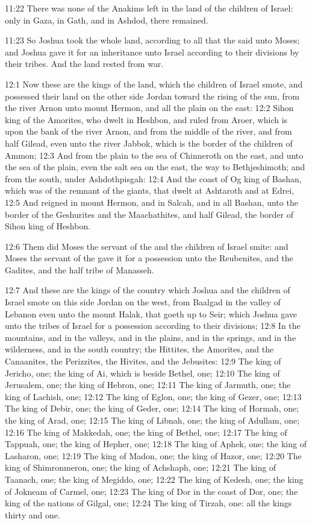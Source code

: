 11:22 There was none of the Anakims left in the land of the children
of Israel: only in Gaza, in Gath, and in Ashdod, there remained.

11:23 So Joshua took the whole land, according to all that the \LORD
said unto Moses; and Joshua gave it for an inheritance unto Israel
according to their divisions by their tribes. And the land rested from
war.

12:1 Now these are the kings of the land, which the children of Israel
smote, and possessed their land on the other side Jordan toward the
rising of the sun, from the river Arnon unto mount Hermon, and all the
plain on the east: 12:2 Sihon king of the Amorites, who dwelt in
Heshbon, and ruled from Aroer, which is upon the bank of the river
Arnon, and from the middle of the river, and from half Gilead, even
unto the river Jabbok, which is the border of the children of Ammon;
12:3 And from the plain to the sea of Chinneroth on the east, and unto
the sea of the plain, even the salt sea on the east, the way to
Bethjeshimoth; and from the south, under Ashdothpisgah: 12:4 And the
coast of Og king of Bashan, which was of the remnant of the giants,
that dwelt at Ashtaroth and at Edrei, 12:5 And reigned in mount
Hermon, and in Salcah, and in all Bashan, unto the border of the
Geshurites and the Maachathites, and half Gilead, the border of Sihon
king of Heshbon.

12:6 Them did Moses the servant of the \LORD and the children of Israel
smite: and Moses the servant of the \LORD gave it for a possession unto
the Reubenites, and the Gadites, and the half tribe of Manasseh.

12:7 And these are the kings of the country which Joshua and the
children of Israel smote on this side Jordan on the west, from Baalgad
in the valley of Lebanon even unto the mount Halak, that goeth up to
Seir; which Joshua gave unto the tribes of Israel for a possession
according to their divisions; 12:8 In the mountains, and in the
valleys, and in the plains, and in the springs, and in the wilderness,
and in the south country; the Hittites, the Amorites, and the
Canaanites, the Perizzites, the Hivites, and the Jebusites: 12:9 The
king of Jericho, one; the king of Ai, which is beside Bethel, one;
12:10 The king of Jerusalem, one; the king of Hebron, one; 12:11 The
king of Jarmuth, one; the king of Lachish, one; 12:12 The king of
Eglon, one; the king of Gezer, one; 12:13 The king of Debir, one; the
king of Geder, one; 12:14 The king of Hormah, one; the king of Arad,
one; 12:15 The king of Libnah, one; the king of Adullam, one; 12:16
The king of Makkedah, one; the king of Bethel, one; 12:17 The king of
Tappuah, one; the king of Hepher, one; 12:18 The king of Aphek, one;
the king of Lasharon, one; 12:19 The king of Madon, one; the king of
Hazor, one; 12:20 The king of Shimronmeron, one; the king of Achshaph,
one; 12:21 The king of Taanach, one; the king of Megiddo, one; 12:22
The king of Kedesh, one; the king of Jokneam of Carmel, one; 12:23 The
king of Dor in the coast of Dor, one; the king of the nations of
Gilgal, one; 12:24 The king of Tirzah, one: all the kings thirty and
one.

